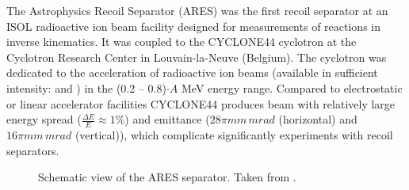 The Astrophysics Recoil Separator (ARES) was the first recoil separator at an ISOL radioactive ion beam facility designed for measurements of  reactions in inverse kinematics. It was coupled to the CYCLONE44 cyclotron at the Cyclotron Research Center in Louvain-la-Neuve (Belgium). The cyclotron was dedicated to the acceleration of radioactive ion beams (available in sufficient intensity:  and ) in the (0.2 -- 0.8)$\cdot A$ MeV energy range. Compared to electrostatic or linear accelerator facilities CYCLONE44 produces beam with relatively large energy spread ($\frac{\Delta{}E}{E} \approx 1\%$) and emittance ($28\pi \unit{mm\,mrad}$ (horizontal) and $16\pi \unit{mm\,mrad}$ (vertical)), which complicate significantly experiments with recoil separators.
\begin{figure}
\begin{center}
\caption{Schematic view of the ARES separator. Taken from \cite{coud03}.}
\label{fig:ares}
\end{center}
\end{figure}

